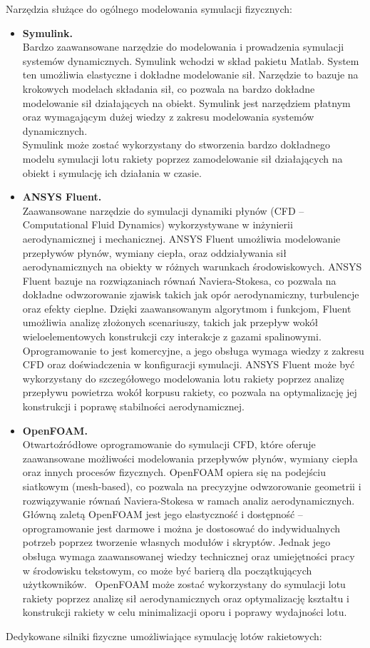 Narzędzia służące do ogólnego modelowania symulacji fizycznych:
\begin{itemize}
    \item \textbf{Symulink.} \\Bardzo zaawansowane narzędzie do
    modelowania i prowadzenia symulacji systemów dynamicznych. Symulink
    wchodzi w skład pakietu Matlab. System ten umożliwia elastyczne i
    dokładne modelowanie sił. Narzędzie to bazuje na krokowych modelach
    składania sił, co pozwala na bardzo dokładne modelowanie sił
    działających na obiekt. Symulink jest narzędziem płatnym oraz
    wymagającym dużej wiedzy z zakresu modelowania systemów dynamicznych. \\
    Symulink może zostać wykorzystany do stworzenia bardzo dokładnego modelu
    symulacji lotu rakiety poprzez zamodelowanie sił działających na
    obiekt i symulację ich działania w czasie.


    \item \textbf{ANSYS Fluent.}
    \\Zaawansowane narzędzie do symulacji dynamiki płynów (CFD – Computational Fluid Dynamics) wykorzystywane w inżynierii aerodynamicznej i mechanicznej. ANSYS Fluent umożliwia modelowanie przepływów płynów, wymiany ciepła, oraz oddziaływania sił aerodynamicznych na obiekty w różnych warunkach środowiskowych.
    ANSYS Fluent bazuje na rozwiązaniach równań Naviera-Stokesa, co pozwala na dokładne odwzorowanie zjawisk takich jak opór aerodynamiczny, turbulencje oraz efekty cieplne. Dzięki zaawansowanym algorytmom i funkcjom, Fluent umożliwia analizę złożonych scenariuszy, takich jak przepływ wokół wieloelementowych konstrukcji czy interakcje z gazami spalinowymi.
    Oprogramowanie to jest komercyjne, a jego obsługa wymaga wiedzy z zakresu CFD oraz doświadczenia w konfiguracji symulacji.
    ANSYS Fluent może być wykorzystany do szczegółowego modelowania lotu rakiety poprzez analizę przepływu powietrza wokół korpusu rakiety, co pozwala na optymalizację jej konstrukcji i poprawę stabilności aerodynamicznej.


    \item \textbf{OpenFOAM.}
    \\Otwartoźródłowe oprogramowanie do symulacji CFD, które oferuje zaawansowane możliwości modelowania przepływów płynów, wymiany ciepła oraz innych procesów fizycznych. OpenFOAM opiera się na podejściu siatkowym (mesh-based), co pozwala na precyzyjne odwzorowanie geometrii i rozwiązywanie równań Naviera-Stokesa w ramach analiz aerodynamicznych.
    Główną zaletą OpenFOAM jest jego elastyczność i dostępność – oprogramowanie jest darmowe i można je dostosować do indywidualnych potrzeb poprzez tworzenie własnych modułów i skryptów. Jednak jego obsługa wymaga zaawansowanej wiedzy technicznej oraz umiejętności pracy w środowisku tekstowym, co może być barierą dla początkujących użytkowników. \
    OpenFOAM może zostać wykorzystany do symulacji lotu rakiety poprzez analizę sił aerodynamicznych oraz optymalizację kształtu i konstrukcji rakiety w celu minimalizacji oporu i poprawy wydajności lotu.

\end{itemize}
Dedykowane silniki fizyczne umożliwiające symulację lotów rakietowych:

